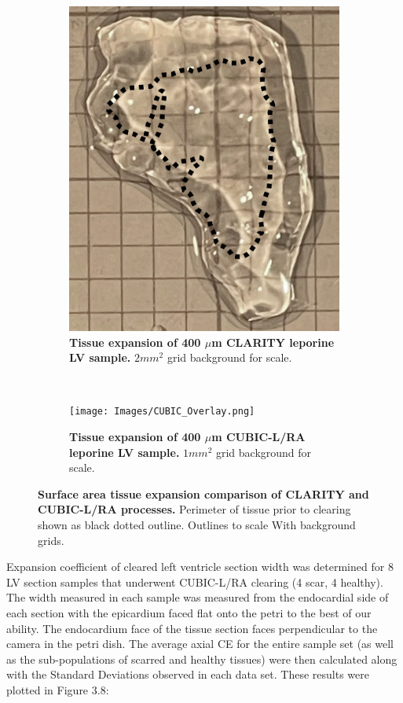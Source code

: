 \begin{figure}[H]
\centering
    \begin{subfigure}[t]{0.45\textwidth}
        \centering
        \includegraphics[width=1\linewidth]{Images/CLARITY_Overlay.png}
        \caption{\textbf{Tissue expansion of 400 $\mu$m CLARITY leporine LV sample.} $2 mm^2$ grid background for scale.}
    \end{subfigure}
    ~
    \begin{subfigure}[t]{0.45\textwidth}
        \centering
        \texttt{[image: Images/CUBIC\_Overlay.png]}
        \caption{\textbf{Tissue expansion of 400 $\mu$m CUBIC-L/RA leporine LV sample.} $1 mm^2$ grid background for scale.}
    \end{subfigure}
    \caption{\textbf{Surface area tissue expansion comparison of CLARITY and CUBIC-L/RA processes.} Perimeter of tissue prior to clearing shown as black dotted outline. Outlines to scale With background grids.}
    \label{fig:enter-label}
\end{figure}


Expansion coefficient of cleared left ventricle section width was determined for 8 LV section samples that underwent CUBIC-L/RA clearing (4 scar, 4 healthy). The width measured in each sample was measured from the endocardial side of each section with the epicardium faced flat onto the petri to the best of our ability. The endocardium face of the tissue section faces perpendicular to the camera in the petri dish. The average axial CE for the entire sample set (as well as the sub-populations of scarred and healthy tissues) were then calculated along with the Standard Deviations observed in each data set. These results were plotted in Figure 3.8:  



